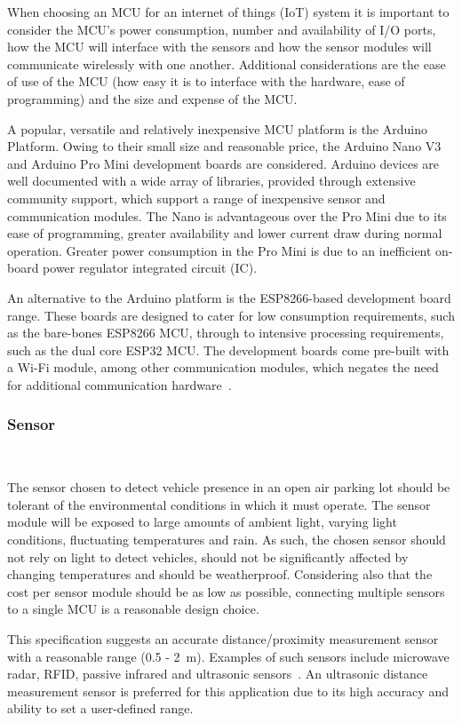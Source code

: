 \documentclass[10pt,twocolumn]{witseiepaper}
\begin{document}
			When choosing an MCU for an internet of things (IoT) system it is important to consider the MCU's power consumption, number and availability of I/O ports, how the MCU will interface with the sensors and how the sensor modules will communicate wirelessly with one another. Additional considerations are the ease of use of the MCU (how easy it is to interface with the hardware, ease of programming) and the size and expense of the MCU.
			
			A popular, versatile and relatively inexpensive MCU platform is the Arduino Platform. Owing to their small size and reasonable price, the Arduino Nano V3 and Arduino Pro Mini development boards are considered. Arduino devices are well documented with a wide array of libraries, provided through extensive community support, which support a range of inexpensive sensor and communication modules. The Nano is advantageous over the Pro Mini due to its ease of programming, greater availability and lower current draw during normal operation. Greater power consumption in the Pro Mini is due to an inefficient on-board power regulator integrated circuit (IC).

			An alternative to the Arduino platform is the ESP8266-based development board range. 
			These boards are designed to cater for low consumption requirements, such as the bare-bones ESP8266 MCU, through to intensive processing requirements, such as the dual core ESP32 MCU. The development boards come pre-built with a \mbox{Wi-Fi} module, among other communication modules, which negates the need for additional communication hardware~\cite{esp12e}.
			
		\subsubsection{Sensor} $   $
			
			The sensor chosen to detect vehicle presence in an open air parking lot should be tolerant of the environmental conditions in which it must operate. The sensor module will be exposed to large amounts of ambient light, varying light conditions, fluctuating temperatures and rain. As such, the chosen sensor should not rely on light to detect vehicles, should not be significantly affected by changing temperatures and should be weatherproof. Considering also that the cost per sensor module should be as low as possible, connecting multiple sensors to a single MCU is a reasonable design choice.
			
			This specification suggests an accurate distance/proximity measurement sensor with a reasonable range (0.5 - 2~m). Examples of such sensors include microwave radar, RFID, passive infrared and ultrasonic sensors~\cite{parkingSystem}. An ultrasonic distance measurement sensor is preferred for this application due to its high accuracy and ability to set a user-defined range.
			
\end{document}
